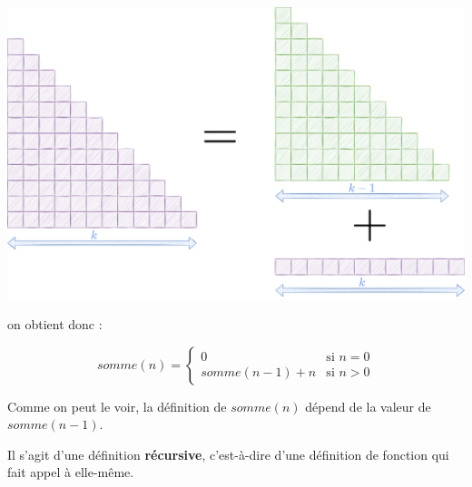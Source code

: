 \documentclass[a4paper,17pt]{extarticle}
\begin{document}
\begin{reponse}
\includegraphics{res/sommek.png}

on obtient donc :

\[
somme(n) = \left\{
    \begin{array}{ll}
        0 & \text{si }n=0 \\
        somme (n-1) + n & \text{si }n>0 
    \end{array}
\right.
\]

            \end{reponse}
    Comme on peut le voir, la définition de \(somme(n)\) dépend de la valeur
de \(somme(n-1)\).

Il s'agit d'une définition \textbf{récursive}, c'est-à-dire d'une
définition de fonction qui fait appel à elle-même.
\end{document}
